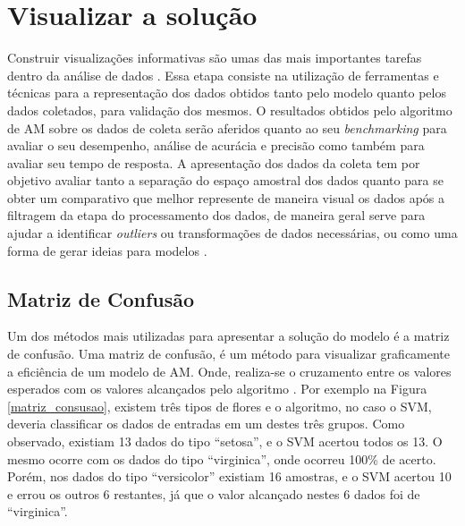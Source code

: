 \section{Visualizar a solução}
Construir visualizações informativas são umas das mais importantes tarefas dentro da análise de dados \cite{McKinney2012datapython}. Essa etapa consiste na utilização de ferramentas e técnicas para a representação dos dados obtidos tanto pelo modelo quanto pelos dados coletados, para validação dos mesmos. O resultados obtidos pelo algoritmo de AM sobre os dados de coleta serão aferidos quanto ao seu \textit{benchmarking} \cite{Benchmarking} para avaliar o seu desempenho, análise de acurácia e precisão como também para avaliar seu tempo de resposta. A apresentação dos dados da coleta tem por objetivo avaliar tanto a separação do espaço amostral dos dados quanto para se obter um comparativo que melhor represente de maneira visual os dados após a filtragem da etapa do processamento dos dados, de maneira geral serve para ajudar a identificar \textit{outliers} ou transformações de dados necessárias, ou como uma forma de gerar ideias para modelos \cite{McKinney2012datapython}.

\subsection{Matriz de Confusão}
\label{sc:matrizconsusao}
Um dos métodos mais utilizadas para apresentar a solução do modelo é a matriz de confusão. Uma matriz de confusão, é um método para visualizar graficamente a eficiência de um modelo de AM. Onde, realiza-se o cruzamento entre os valores esperados com os valores alcançados pelo algoritmo \cite{caelen2017bayesian}. Por exemplo na Figura \ref{matriz_consusao}, existem três tipos de flores e o algoritmo, no caso o SVM, deveria classificar os dados de entradas em um destes três grupos. Como observado, existiam 13 dados do tipo “setosa”, e o SVM acertou todos os 13. O mesmo ocorre com os dados do tipo “virginica”, onde ocorreu 100\% de acerto. Porém, nos dados do tipo “versicolor” existiam 16 amostras, e o SVM acertou 10 e errou os outros 6 restantes, já que o valor alcançado nestes 6 dados foi de “virginica”.

